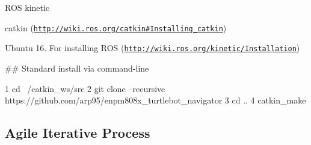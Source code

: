 \begin{DoxyEnumerate}
\item R\+OS kinetic
\item catkin (\href{http://wiki.ros.org/catkin#Installing_catkin}{\tt http\+://wiki.\+ros.\+org/catkin\#\+Installing\+\_\+catkin})
\item Ubuntu 16. For installing R\+OS (\href{http://wiki.ros.org/kinetic/Installation}{\tt http\+://wiki.\+ros.\+org/kinetic/\+Installation})
\end{DoxyEnumerate}

\#\# Standard install via command-\/line 
\begin{DoxyCode}
1 cd ~/catkin\_ws/src
2 git clone --recursive https://github.com/arp95/enpm808x\_turtlebot\_navigator
3 cd ..
4 catkin\_make
\end{DoxyCode}


\subsection*{Agile Iterative Process}

\href{https://docs.google.com/spreadsheets/d/1Gf2HPhlzFCxhdOP1XlNDx23QuuKKL7okn-5ru6TXR6c/edit?usp=sharing}{\tt } 